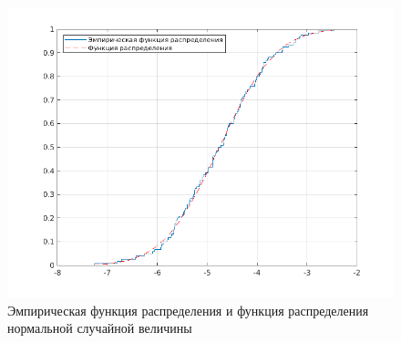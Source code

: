 \begin{figure}[pt!]
	\centering
	\includegraphics{../img/figure2}
	\caption{Эмпирическая функция распределения и функция распределения нормальной случайной величины}
\end{figure}